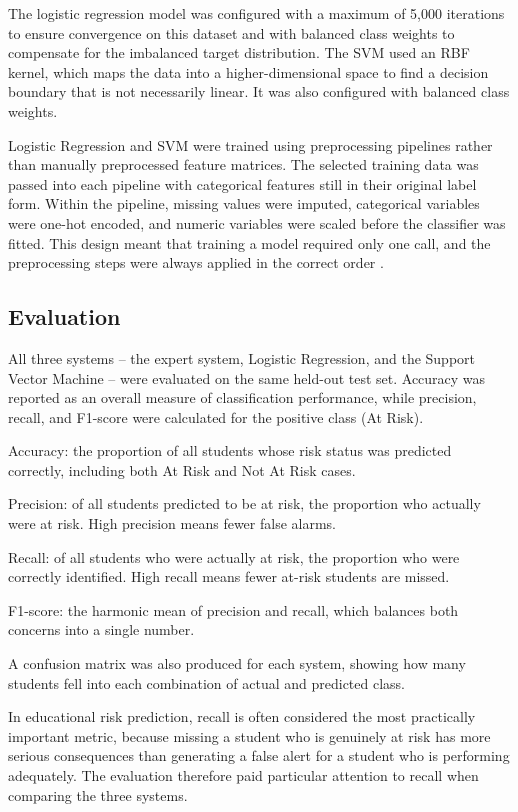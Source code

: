 The logistic regression model was configured with a maximum of 5,000 iterations to ensure convergence on this dataset and with balanced class weights to compensate for the imbalanced target distribution. The SVM used an RBF kernel, which maps the data into a higher-dimensional space to find a decision boundary that is not necessarily linear. It was also configured with balanced class weights.

Logistic Regression and SVM were trained using preprocessing pipelines rather than manually preprocessed feature matrices. The selected training data was passed into each pipeline with categorical features still in their original label form. Within the pipeline, missing values were imputed, categorical variables were one-hot encoded, and numeric variables were scaled before the classifier was fitted. This design meant that training a model required only one call, and the preprocessing steps were always applied in the correct order \parencite{pedregosa2011scikit}.

\subsection{Evaluation}

All three systems -- the expert system, Logistic Regression, and the Support Vector Machine -- were evaluated on the same held-out test set. Accuracy was reported as an overall measure of classification performance, while precision, recall, and F1-score were calculated for the positive class (At Risk).

Accuracy: the proportion of all students whose risk status was predicted correctly, including both At Risk and Not At Risk cases.

Precision: of all students predicted to be at risk, the proportion who actually were at risk. High precision means fewer false alarms.

Recall: of all students who were actually at risk, the proportion who were correctly identified. High recall means fewer at-risk students are missed.

F1-score: the harmonic mean of precision and recall, which balances both concerns into a single number.

A confusion matrix was also produced for each system, showing how many students fell into each combination of actual and predicted class.

In educational risk prediction, recall is often considered the most practically important metric, because missing a student who is genuinely at risk has more serious consequences than generating a false alert for a student who is performing adequately. The evaluation therefore paid particular attention to recall when comparing the three systems.
